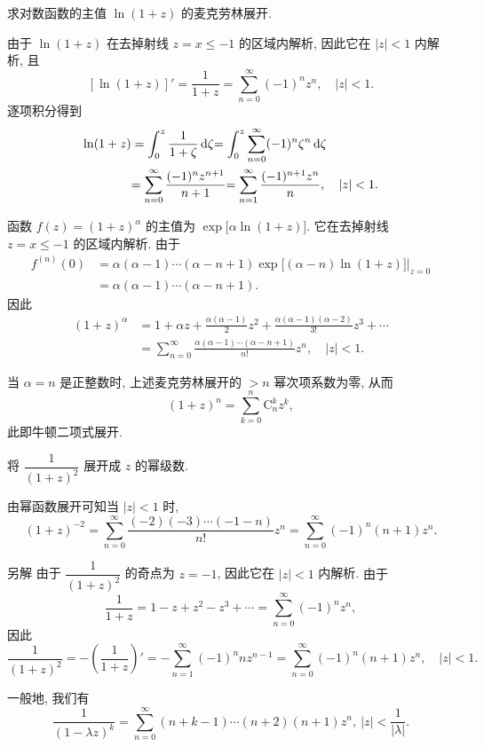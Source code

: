 \begin{example}
求对数函数的主值 $\ln(1+z)$ 的麦克劳林展开.
\end{example}
\begin{solution}
由于 $\ln(1+z)$ 在去掉射线 $z=x\le-1$ 的区域内解析,
{因此它在 $|z|<1$ 内解析,
}{且
	\[[\ln(1+z)]'=\frac1{1+z}=\sum_{n=0}^\infty(-1)^nz^n,\quad|z|<1.\]
}{逐项积分得到
\begin{align*}
\ln(1+z)&=\int_0^z\frac1{1+\zeta}\,\mathrm{d}\zeta
	{=\int_0^z\sum_{n=0}^\infty(-1)^n\zeta^n\,\mathrm{d}\zeta}\\
&{=\sum_{n=0}^\infty\frac{(-1)^nz^{n+1}}{n+1}}
	{=\sum_{n=1}^\infty\frac{(-1)^{n+1}z^n}{n},\quad|z|<1.}
\end{align*}}
\end{solution}

\begin{example}
	函数 $f(z)=(1+z)^\alpha$ 的主值为 $\exp\bigl[\alpha\ln(1+z)\bigr]$. 它在去掉射线 $z=x\le -1$ 的区域内解析. 由于
	\begin{align*}
		f^{(n)}(0)&=\alpha(\alpha-1)\cdots(\alpha-n+1)\exp\bigl[(\alpha-n)\ln(1+z)\bigr]\Big|_{z=0}\\
		&=\alpha(\alpha-1)\cdots(\alpha-n+1).
	\end{align*}
	因此
	\begin{align*}
		(1+z)^\alpha&=1+\alpha z+\frac{\alpha(\alpha-1)}2z^2+\frac{\alpha(\alpha-1)(\alpha-2)}{3!}z^3+\cdots\\
		&=\sum_{n=0}^\infty\frac{\alpha(\alpha-1)\cdots(\alpha-n+1)}{n!}z^n,\quad |z|<1.
	\end{align*}
\end{example}

当 $\alpha=n$ 是正整数时, 上述麦克劳林展开的 $>n$ 幂次项系数为零, 
从而
	\[(1+z)^n=\sum_{k=0}^n \mathrm{C}_n^k z^k,\]
此即牛顿二项式展开.

\begin{example}
	将 $\dfrac1{(1+z)^2}$ 展开成 $z$ 的幂级数.
\end{example}

\begin{solution}
	由幂函数展开可知当 $|z|<1$ 时,
	\[(1+z)^{-2}=\sum_{n=0}^\infty \frac{(-2)(-3)\cdots(-1-n)}{n!}z^n
	{=\sum_{n=0}^\infty (-1)^n(n+1)z^n.}\]
\end{solution}

\begin{solution}{另解}
	由于 $\dfrac1{(1+z)^2}$ 的奇点为 $z=-1$, 因此它在 $|z|<1$ 内解析.
	{由于
		\[\frac1{1+z}=1-z+z^2-z^3+\cdots=\sum_{n=0}^\infty (-1)^nz^n,\]因此
		\[
		\frac1{(1+z)^2}=-\left(\frac1{1+z}\right)'
		{=-\sum_{n=1}^\infty(-1)^n nz^{n-1}}
		{=\sum_{n=0}^\infty(-1)^n (n+1)z^n,\quad |z|<1.}
		\]
	}
\end{solution}
一般地, 我们有
\[\frac1{(1-\lambda z)^k}=\sum_{n=0}^\infty(n+k-1)\cdots(n+2)(n+1)z^n,\ |z|<\frac1{|\lambda|}.\]

